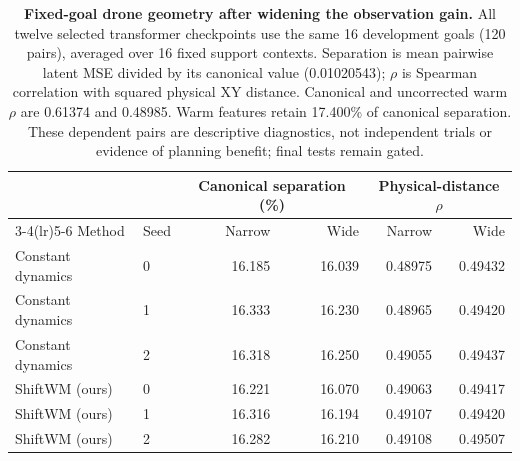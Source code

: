 \begin{table}[t]
\centering
\fontsize{9}{11}\selectfont
\setlength{\tabcolsep}{5pt}
\begin{tabular}{llrrrr}
\toprule
 & & \multicolumn{2}{c}{Canonical separation (\%)} & \multicolumn{2}{c}{Physical-distance $\rho$} \\
\cmidrule(lr){3-4}\cmidrule(lr){5-6}
Method & Seed & Narrow & Wide & Narrow & Wide \\
\midrule
Constant dynamics & 0 & 16.185 & 16.039 & 0.48975 & 0.49432 \\
Constant dynamics & 1 & 16.333 & 16.230 & 0.48965 & 0.49420 \\
Constant dynamics & 2 & 16.318 & 16.250 & 0.49055 & 0.49437 \\
\midrule
ShiftWM (ours) & 0 & 16.221 & 16.070 & 0.49063 & 0.49417 \\
ShiftWM (ours) & 1 & 16.316 & 16.194 & 0.49107 & 0.49420 \\
ShiftWM (ours) & 2 & 16.282 & 16.210 & 0.49108 & 0.49507 \\
\bottomrule
\end{tabular}
\caption{\textbf{Fixed-goal drone geometry after widening the observation gain.}
All twelve selected transformer checkpoints use the same 16 development goals
(120 pairs), averaged over 16 fixed support contexts. Separation is mean
pairwise latent MSE divided by its canonical value (0.01020543); $\rho$ is
Spearman correlation with squared physical XY distance. Canonical and
uncorrected warm $\rho$ are 0.61374 and 0.48985. Warm features retain 17.400\%
of canonical separation. These dependent pairs are descriptive diagnostics,
not independent trials or evidence of planning benefit; final tests remain gated.}
\label{tab:extension-geometry-diagnostic}
\end{table}
